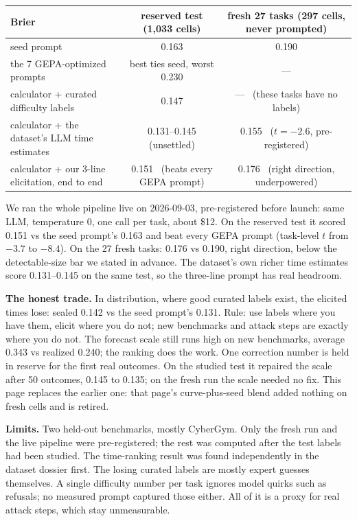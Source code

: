 \documentclass[10pt]{article}
\begin{document}
\begin{center}\small
\begin{tabular}{@{}lcc@{}}
\toprule
Brier & reserved test (1{,}033 cells) & fresh 27 tasks (297 cells, never prompted)\\
\midrule
seed prompt & 0.163 & 0.190\\
the 7 GEPA-optimized prompts & best ties seed, worst 0.230 & ---\\
calculator + curated difficulty labels & \textcolor{grn}{0.147} & --- \ (these tasks have no labels)\\
calculator + the dataset's LLM time estimates & 0.131--0.145 (unsettled) & \textcolor{grn}{0.155 \ ($t=-2.6$, pre-registered)}\\
calculator + our 3-line elicitation, end to end & \textcolor{grn}{0.151 \ (beats every GEPA prompt)} & 0.176 \ (right direction, underpowered)\\
\bottomrule
\end{tabular}
\end{center}

{\small We ran the whole pipeline live on 2026-09-03, pre-registered before launch: same LLM, temperature 0, one call per task, about \$12. On the reserved test it scored 0.151 vs the seed prompt's 0.163 and beat every GEPA prompt (task-level $t$ from $-3.7$ to $-8.4$). On the 27 fresh tasks: 0.176 vs 0.190, right direction, below the detectable-size bar we stated in advance. The dataset's own richer time estimates score 0.131--0.145 on the same test, so the three-line prompt has real headroom.}

\textbf{The honest trade.} In distribution, where good curated labels exist, the elicited times lose: sealed 0.142 vs the seed prompt's 0.131. Rule: use labels where you have them, elicit where you do not; new benchmarks and attack steps are exactly where you do not. The forecast scale still runs high on new benchmarks, average 0.343 vs realized 0.240; the ranking does the work. One correction number is held in reserve for the first real outcomes. On the studied test it repaired the scale after 50 outcomes, 0.145 to 0.135; on the fresh run the scale needed no fix. This page replaces the earlier one: that page's curve-plus-seed blend added nothing on fresh cells and is retired.

\textbf{Limits.} Two held-out benchmarks, mostly CyberGym. Only the fresh run and the live pipeline were pre-registered; the rest was computed after the test labels had been studied. The time-ranking result was found independently in the dataset dossier first. The losing curated labels are mostly expert guesses themselves. A single difficulty number per task ignores model quirks such as refusals; no measured prompt captured those either. All of it is a proxy for real attack steps, which stay unmeasurable.
\end{document}
